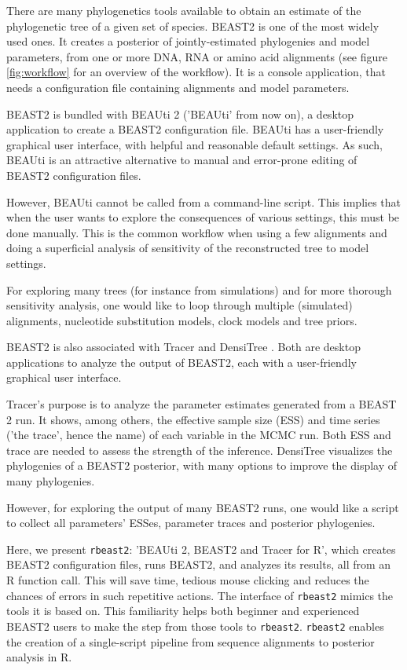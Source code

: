 \documentclass{article}
\begin{document}
There are many phylogenetics tools available to obtain an estimate 
of the phylogenetic tree of a given set of species. 
BEAST2 \cite{bouckaert2014beast} is one of the most widely used ones. 
It creates a posterior of jointly-estimated phylogenies and model parameters, 
from one or more DNA, RNA or amino acid alignments (see figure \ref{fig:workflow} 
for an overview of the workflow). 
It is a console application, that needs a configuration file containing 
alignments and model parameters.

BEAST2 is bundled with BEAUti 2 \cite{drummond2012bayesian} ('BEAUti' from now on), 
a desktop application to create a BEAST2 configuration file.
BEAUti has a user-friendly graphical user interface, with helpful and 
reasonable default settings.
As such, BEAUti is an attractive alternative 
to manual and error-prone editing of BEAST2 configuration files. 

However, BEAUti cannot be called from a command-line script.
This implies that when the user 
wants to explore the consequences of various settings, this must be done manually.
This is the common workflow when using a few alignments and doing a superficial 
analysis of sensitivity of the reconstructed tree to model settings. 

For exploring many trees (for instance from simulations) and for
more thorough sensitivity analysis, one would like to loop through 
multiple (simulated) alignments, nucleotide substitution models, 
clock models and tree priors. 

BEAST2 is also associated with Tracer \cite{tracer} and 
DensiTree \cite{DensiTree}. Both are desktop applications 
to analyze the output of BEAST2, each with a user-friendly graphical user interface. 

Tracer's purpose is to analyze the parameter estimates generated
from a BEAST 2 run. It shows, among
others, the effective sample size (ESS) and time series ('the trace', 
hence the name) of each variable in the MCMC run. Both ESS and trace
are needed to assess the strength of the inference. 
DensiTree visualizes the phylogenies of a BEAST2 posterior, with
many options to improve the display of many phylogenies.

However, for exploring the output of many BEAST2 runs, 
one would like a script to collect all parameters' ESSes,
parameter traces and posterior phylogenies. 

Here, we present \verb;rbeast2;:
’BEAUti 2, BEAST2 and Tracer for R’, 
which creates BEAST2 configuration files,
runs BEAST2, and analyzes its results,
all from an R function call. This
will save time, tedious mouse clicking and 
reduces the chances of errors in such repetitive actions.
The interface of \verb;rbeast2; mimics the tools it
is based on. This
familiarity helps both beginner and experienced BEAST2 users 
to make the step from those tools to \verb;rbeast2;.
\verb;rbeast2; enables the creation of a single-script 
pipeline from sequence alignments to posterior analysis in R. 
\end{document}
